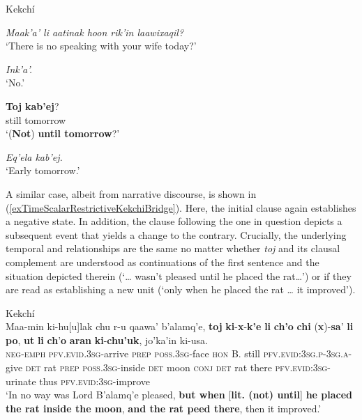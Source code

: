 \begin{exe}
	\ex Kekchí\label{exTimeScalarRestictiveKekchiWife}
	\begin{xlist}
		\textit{Maak'a' li aatinak hoon rik'in laawixaqil?}\\
		\lq There is no speaking with your wife today?\rq
		
		\textit{Ink'a'.}\\
		\lq No.'
		
		\gll \textbf{Toj} \textbf{kab'ej}?\\
		still tomorrow\\
		\glt \lq (\textbf{Not}) \textbf{until tomorrow}?'
		
		\textit{Eq'ela kab'ej.}\\
		\glt \lq Early tomorrow.' \parencite[465]{Kockelman2020}
	\end{xlist}
\end{exe}

A similar case, albeit from narrative discourse, is shown in (\ref{exTimeScalarRestrictiveKekchiBridge}). Here, the initial clause again establishes a negative state. In addition, the clause following the one in question depicts a subsequent event that yields a change to the contrary. Crucially, the underlying temporal and  relationships are the same no matter whether \textit{toj} and its clausal complement are understood as continuations of the first sentence and the situation depicted therein (\lq  … wasn't pleased until he placed the rat…\rq{}) or if they are read as establishing a new unit (\lq only when he placed the rat … it improved\rq{}).

\begin{exe}
	\ex Kekchí\label{exTimeScalarRestrictiveKekchiBridge}\\
	\gll Maa-min ki-hu[u]lak chu r-u qaawa\rq{} b\rq{}alamq\rq{}e, \textbf{toj} \textbf{ki}-\textbf{x}-\textbf{k\rq{}e} \textbf{li} \textbf{ch\rq{}o} \textbf{chi} \textup{(}\textbf{x}\textup{)}-\textbf{sa}\rq{} \textbf{li} \textbf{po}, \textbf{ut} \textbf{li} \textbf{ch}\rq{}\textbf{o} \textbf{aran} \textbf{ki}-\textbf{chu\rq{}uk}, jo\rq{}ka\rq{}in ki-usa.\\
		\textsc{neg}-\textsc{emph} \textsc{pfv}.\textsc{evid}.3\textsc{sg}-arrive \textsc{prep} \textsc{poss}.3\textsc{sg}-face \textsc{hon} B. still \textsc{pfv}.\textsc{evid}:3\textsc{sg}.\textsc{p}-3\textsc{sg}.\textsc{a}-give \textsc{det} rat \textsc{prep} \textsc{poss}.3\textsc{sg}-inside \textsc{det} moon \textsc{conj} \textsc{det} rat there \textsc{pfv}.\textsc{evid}:3\textsc{sg}-urinate thus \textsc{pfv}.\textsc{evid}:3\textsc{sg}-improve\\
\glt \lq In no way was Lord B’alamq’e pleased, \textbf{but when} [\textbf{lit. (not) until}] \textbf{he placed the rat inside the moon}, \textbf{and the rat peed there}, then it improved.\rq{ }\parencite[236]{Kockelman2010}
\end{exe}

